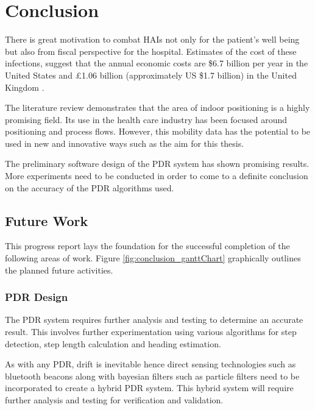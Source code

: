 \chapter{Conclusion}\label{ch:conclusion}

	There is great motivation to combat HAIs not only for the patient's well being but also from fiscal perspective for the hospital. Estimates of the cost of these infections, suggest that the annual economic costs are \$6.7 billion per year in the United States \cite{martone1992incidence} and \pounds1.06 billion (approximately US \$1.7 billion) in the United Kingdom \cite{plowman2001rate}. 
    
    The literature review demonstrates that the area of indoor positioning is a highly promising field. Its use in the health care industry has been focused around positioning and process flows. However, this mobility data has the potential to be used in new and innovative ways such as the aim for this thesis.
    
    The preliminary software design of the PDR system has shown promising results. More experiments need to be conducted in order to come to a definite conclusion on the accuracy of the PDR algorithms used. 
	
	\section{Future Work} \label{sec:conclusion_future}
    
    	This progress report lays the foundation for the successful completion of the following areas of work. Figure \ref{fig:conclusion_ganttChart} graphically outlines the planned future activities.
        
        \begin{sidewaysfigure}
          \caption{Thesis Plan}
          \label{fig:conclusion_ganttChart}
        \end{sidewaysfigure}
    
    	\subsection{PDR Design}
        	The PDR system requires further analysis and testing to determine an accurate result. This involves further experimentation using various algorithms for step detection, step length calculation and heading estimation. 
            
            As with any PDR, drift is inevitable hence direct sensing technologies such as bluetooth beacons along with bayesian filters such as particle filters need to be incorporated to create a hybrid PDR system. This hybrid system will require further analysis and testing for verification and validation.
        

